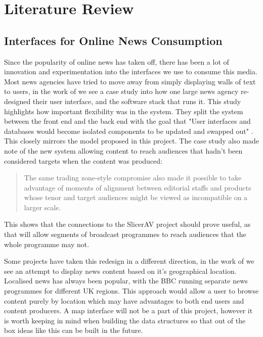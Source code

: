 \documentclass[12pt,titlepage]{article}
\begin{document}
\section{Literature Review}

  \subsection{Interfaces for Online News Consumption}

  Since the popularity of online news has taken off, there has been a lot of
  innovation and experimentation into the interfaces we use to consume this
  media. Most news agencies have tried to move away from simply displaying walls
  of text to users, in the work of \cite{msnbc} we see a case study into how one
  large news agency re-designed their user interface, and the software stack
  that runs it. This study highlights how important flexibility was in the
  system. They split the system between the front end and the back end with the
  goal that "User interfaces and databases would become isolated components to
  be updated and swapped out" \citep{msnbc}. This closely mirrors the model
  proposed in this project. The case study also made note of the new system
  allowing content to reach audiences that hadn't been considered targets when
  the content was produced:

  \begin{quote}
    The same trading zone-style compromise also made it possible to take advantage
    of moments of alignment between editorial staffs and products whose tenor and
    target audiences might be viewed as incompatible on a larger scale.
  \end{quote}

  This shows that the connections to the SlicerAV project should prove useful,
  as that will allow segments of broadcast programmes to reach audiences that
  the whole programme may not.

  Some projects have taken this redesign in a different direction, in the work of
  \cite{newsstand} we see an attempt to display news content based on it's
  geographical location. Localised news has always been popular, with the BBC
  running separate news programmes for different UK regions. This approach would
  allow a user to browse content purely by location which may have advantages to
  both end users and content producers. A map interface will not be a part of
  this project, however it is worth keeping in mind when building the data
  structures so that out of the box ideas like this can be built in the future.
\end{document}
